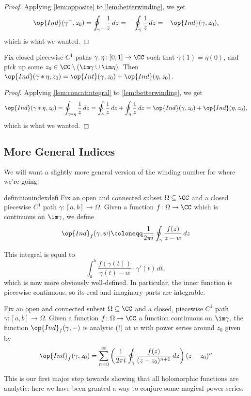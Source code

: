\begin{proof}
	Applying \autoref{lem:opposite} to \autoref{lem:betterwinding}, we get
	\[\op{Ind}(\gamma^-,z_0)=\oint_{\gamma^-}\frac1z\,dz=-\oint_\gamma\frac1z\,dz=-\op{Ind}(\gamma,z_0),\]
	which is what we wanted.
\end{proof}
\begin{corollary}
	Fix closed piecewise $C^1$ paths $\gamma,\eta\colon [0,1]\to\CC$ such that $\gamma(1)=\eta(0)$, and pick up some $z_0\in\CC\setminus(\im\gamma\cup\im\eta)$. Then $\op{Ind}(\gamma*\eta,z_0)=\op{Int}(\gamma,z_0)+\op{Ind}(\eta,z_0)$.
\end{corollary}
\begin{proof}
	Applying \autoref{lem:concatintegral} to \autoref{lem:betterwinding}, we get
	\[\op{Ind}(\gamma*\eta,z_0)=\oint_{\gamma*\eta}\frac1z\,dz=\oint_\gamma\frac1z\,dz+\oint_\eta\frac1z\,dz=\op{Ind}(\gamma,z_0)+\op{Ind}(\eta,z_0),\]
	which is what we wanted.
\end{proof}

\subsection{More General Indices}
We will want a slightly more general version of the winding number for where we're going.
\begin{restatable}[Index]{definition}{indexdefi}
	Fix an open and connected subset $\Omega\subseteq\CC$ and a closed piecewise $C^1$ path $\gamma\colon [a,b]\to\Omega$. Given a function $f\colon \Omega\to\CC$ which is continuous on $\im\gamma$, we define
	\[\op{Ind}_f(\gamma,w)\coloneqq \frac1{2\pi i}\oint_\gamma\frac{f(z)}{z-w}\,dz\]
\end{restatable}
\begin{remark}
	This integral is equal to
	\[\int_a^b\frac{f(\gamma(t))}{\gamma(t)-w}\cdot\gamma'(t)\,dt,\]
	which is now more obviously well-defined. In particular, the inner function is piecewise continuous, so its real and imaginary parts are integrable.
\end{remark}
\begin{proposition} \label{prop:indexanalytic}
	Fix an open and connected subset $\Omega\subseteq\CC$ and a closed, piecewise $C^1$ path $\gamma\colon [a,b]\to\Omega$. Given a function $f\colon \Omega\to\CC$ a function continuous on $\im\gamma$, the function $\op{Ind}_f(\gamma,-)$ is analytic (!) at $w$ with power series around $z_0$ given by
	\[\op{Ind}_f(\gamma,z_0)=\sum_{n=0}^\infty\left(\frac1{2\pi i}\oint_\gamma\frac{f(z)}{(z-z_0)^{n+1}}\,dz\right)(z-z_0)^n\]
\end{proposition}
This is our first major step towards showing that all holomorphic functions are analytic: here we have been granted a way to conjure some magical power series.

